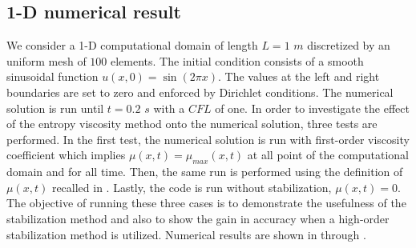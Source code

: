 \subsection{1-D numerical result}\label{sec:1dnum_sct2b}
We consider a 1-D computational domain of length $L=1$ $m$ discretized by an uniform mesh of $100$ elements. The initial condition consists of a smooth sinusoidal function $u(x,0) = \sin \left( 2 \pi x \right)$. The values at the left and right boundaries are set to zero and enforced by Dirichlet conditions. The numerical solution is run until $t=0.2$ $s$ with a $CFL$ of one. In order to investigate the effect of the entropy viscosity method onto the numerical solution, three tests are performed. In the first test, the numerical solution is run with first-order viscosity coefficient which implies $\mu(x,t) = \mu_{max}(x,t)$ at all point of the computational domain and for all time. Then, the same run is performed using the definition of $\mu(x,t)$ recalled in . Lastly, the code is run without stabilization, $\mu(x,t) = 0$. The objective of running these three cases is to demonstrate the usefulness of the stabilization method and also to show the gain in accuracy when a high-order stabilization method is utilized. Numerical results are shown in  through . 
%
